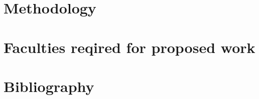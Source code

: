 \documentclass[11pt,a4paper,english]{article}
\begin{document}
\section{Methodology}
\newpage
\section{Faculties reqired for proposed work}
\newpage
\section{Bibliography}

\cite{lin2021encryption}
\end{document}

